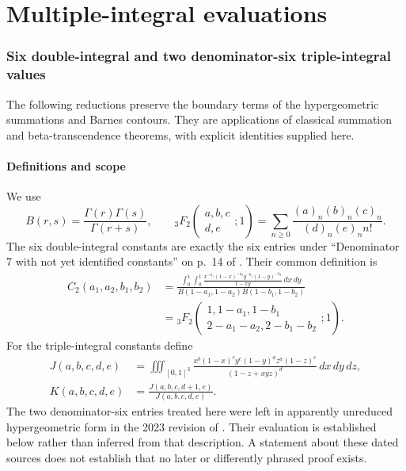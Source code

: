 \documentclass[11pt,a4paper]{article}
\theoremstyle{definition}
\theoremstyle{remark}
\numberwithin{equation}{section}
\begin{document}
\clearpage

\part{Multiple-integral evaluations}
\section{Six double-integral and two denominator-six triple-integral values}
\label{extra-eight}
The following reductions preserve the boundary terms of the hypergeometric
summations and Barnes contours. They are applications of classical summation
and beta-transcendence theorems, with explicit identities supplied here.

\subsection{Definitions and scope}
We use
\[
B(r,s)=\frac{\Gamma(r)\Gamma(s)}{\Gamma(r+s)},\qquad
{}_3F_2\left(\begin{matrix}a,b,c\\d,e\end{matrix};1\right)
=\sum_{n\ge0}\frac{(a)_n(b)_n(c)_n}{(d)_n(e)_n n!}.
\]
The six double-integral constants are exactly the six entries under
``Denominator 7 with not yet identified constants'' on p.~14 of
\cite{extra8-dbkz}. Their common definition is
\begin{align*}
C_2(a_1,a_2,b_1,b_2)
&=\frac{\displaystyle\int_0^1\!\int_0^1
 \frac{x^{-a_1}(1-x)^{-a_2}y^{-b_1}(1-y)^{-b_2}}{1-xy}\,dx\,dy}
 {B(1-a_1,1-a_2)B(1-b_1,1-b_2)}\\
&={}_3F_2\left(\begin{matrix}1,1-a_1,1-b_1\\
2-a_1-a_2,2-b_1-b_2\end{matrix};1\right).
\end{align*}
For the triple-integral constants define
\begin{align*}
J(a,b,c,d,e)&=\iiint_{[0,1]^3}
\frac{x^b(1-x)^cy^e(1-y)^az^a(1-z)^c}{(1-z+xyz)^d}\,dx\,dy\,dz,\\
K(a,b,c,d,e)&=\frac{J(a,b,c,d+1,e)}{J(a,b,c,d,e)}.
\end{align*}
The two denominator-six entries treated here were left in apparently
unreduced hypergeometric form in the 2023 revision of \cite{extra8-zudilin}.
Their evaluation is established below rather than inferred from that
description. A statement about these dated sources does not establish
that no later or differently phrased proof exists.
\end{document}
